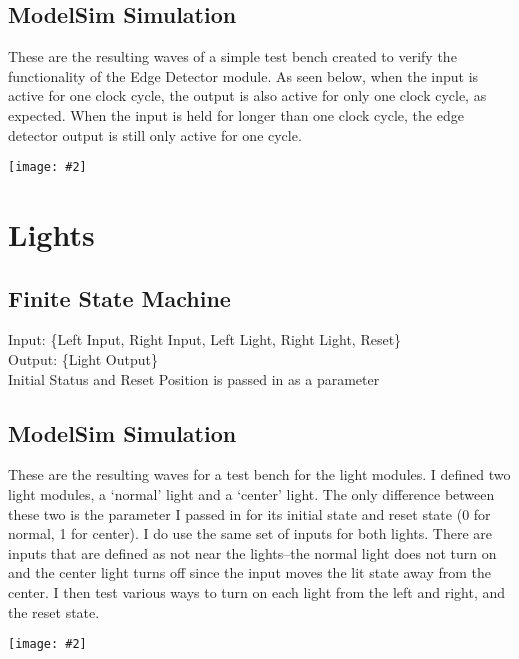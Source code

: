 \documentclass{article}
\newenvironment{solution}{\begin{mdframed}[style=SolutionFrame]}{\end{mdframed}}
\newcommand{\img}[2][0.9]{
    \begin{minipage}[t]{0.9\linewidth}
        \begin{center}
            \texttt{[image: \#2]}
        \end{center}
    \end{minipage}
}
\begin{document}
    \subsection{ModelSim Simulation}
    \begin{solution}
        These are the resulting waves of a simple test bench created to verify the functionality of the Edge Detector module. As seen below, when the input is active for one clock cycle, the output is also active for only one clock cycle, as expected. When the input is held for longer than one clock cycle, the edge detector output is still only active for one cycle. \\
        \img[1]{edge_waves.png}
    \end{solution}

\newpage
\section{Lights}
    \subsection{Finite State Machine}
    \begin{solution}
        Input: \{Left Input, Right Input, Left Light, Right Light, Reset\} \\
        Output: \{Light Output\} \\
        Initial Status and Reset Position is passed in as a parameter
        \begin{center}
        \end{center}
    \end{solution}

    \subsection{ModelSim Simulation}
    \begin{solution}
        These are the resulting waves for a test bench for the light modules. I defined two light modules, a `normal' light and a `center' light. The only difference between these two is the parameter I passed in for its initial state and reset state (0 for normal, 1 for center). I do use the same set of inputs for both lights. There are inputs that are defined as not near the lights--the normal light does not turn on and the center light turns off since the input moves the lit state away from the center. I then test various ways to turn on each light from the left and right, and the reset state. \\
        \img[1]{light_waves.png}
    \end{solution}
\end{document}
